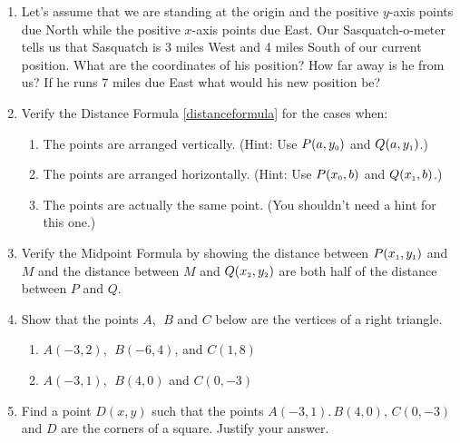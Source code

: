 \documentclass{ximera}
\begin{document}
\begin{enumerate}
\setcounter{enumi}{\value{HW}}

\item Let's assume that we are standing at the origin and the positive $y$-axis points due North while the positive $x$-axis points due East.  Our Sasquatch-o-meter tells us that Sasquatch is 3 miles West and 4 miles South of our current position.  What are the coordinates of his position?  How far away is he from us?  If he runs 7 miles due East what would his new position be?

\item \label{distanceothercases} Verify the Distance Formula \ref{distanceformula} for the cases when:

\begin{enumerate}

\item The points are arranged vertically.  (Hint: Use $P(a, y_{\mbox{\tiny$0$}})$ and $Q(a, y_{\mbox{\tiny$1$}})$.)
\item The points are arranged horizontally. (Hint: Use $P(x_{\mbox{\tiny$0$}}, b)$ and $Q(x_{\mbox{\tiny$1$}}, b)$.)
\item The points are actually the same point. (You shouldn't need a hint for this one.)

\end{enumerate}

\item \label{verifymidpointformula} Verify the Midpoint Formula by showing the distance between $P(x_{\mbox{\tiny$1$}}, y_{\mbox{\tiny$1$}})$ and $M$ and the distance between $M$ and $Q(x_{\mbox{\tiny$2$}}, y_{\mbox{\tiny$2$}})$ are both half of the distance between $P$ and $Q$. 

\item Show that the points $A$, $\;B$ and $C$ below are the vertices of a right triangle.

\begin{multicols}{2}

\begin{enumerate}

\item  $A(-3,2)$, $\;B(-6,4)$, and $C(1,8)$

\item   $A(-3, 1)$, $\;B(4, 0)$ and $C(0, -3)$


\end{enumerate}
\end{multicols}

\item Find a point $D(x, y)$ such that the points $A(-3, 1). \, B(4, 0), \, C(0, -3)$ and $D$ are the corners of a square.  Justify your answer.


\end{enumerate}
\end{document}
